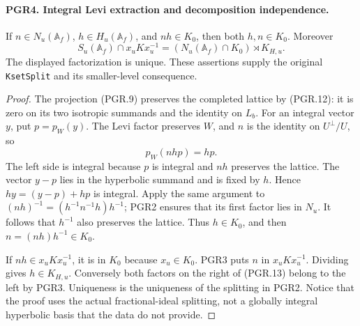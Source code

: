 \documentclass[11pt,a4paper]{article}
\numberwithin{equation}{section}
\theoremstyle{remark}\newtheorem{remark}[theorem]{Remark}
\begin{document}
\paragraph{PGR4. Integral Levi extraction and decomposition independence.}
\label{claim:PGR4}
If \(n\in N_u(\mathbb A_f)\), \(h\in H_u(\mathbb A_f)\),
and \(nh\in K_0\), then both \(h,n\in K_0\).
Moreover
\[
 S_u(\mathbb A_f)\cap x_uKx_u^{-1}
   =(N_u(\mathbb A_f)\cap K_0)\rtimes K_{H,u}.
\tag{PGR.13}
\]
The displayed factorization is unique.  These assertions supply the
original \texttt{Kset\allowbreak Split} and its smaller-level consequence.
\begin{proof}
The projection (PGR.9) preserves the completed lattice by (PGR.12):
it is zero on its two isotropic summands and the identity on \(L_b\).
For an integral vector \(y\), put \(p=p_W(y)\).  The Levi
factor preserves \(W\), and \(n\) is the identity on
\(U^\perp/U\), so
\[
                  p_W(nhp)=hp.
\]
The left side is integral because \(p\) is integral and \(nh\)
preserves the lattice.  The vector \(y-p\) lies in the hyperbolic
summand and is fixed by \(h\).  Hence
\(hy=(y-p)+hp\) is integral.  Apply the same argument to
\((nh)^{-1}=(h^{-1}n^{-1}h)h^{-1}\); PGR2 ensures that
its first factor lies in \(N_u\).  It follows that \(h^{-1}\)
also preserves the lattice.  Thus \(h\in K_0\), and then
\(n=(nh)h^{-1}\in K_0\).

If \(nh\in x_uKx_u^{-1}\), it is in \(K_0\) because
\(x_u\in K_0\).  PGR3 puts \(n\) in \(x_uKx_u^{-1}\).
Dividing gives \(h\in K_{H,u}\).  Conversely both factors on
the right of (PGR.13) belong to the left by PGR3.  Uniqueness is
the uniqueness of the splitting in PGR2.  Notice that the proof uses
the actual fractional-ideal splitting, not a globally integral
hyperbolic basis that the data do not provide.
\end{proof}

\end{document}
